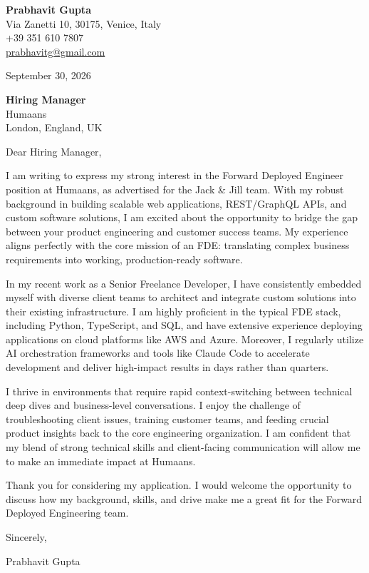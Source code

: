 \documentclass[11pt,a4paper]{article}
\begin{document}
\begin{flushleft}
\textbf{Prabhavit Gupta} \\
Via Zanetti 10, 30175, Venice, Italy \\
+39 351 610 7807 \\
\href{mailto:prabhavitg@gmail.com}{prabhavitg@gmail.com}
\end{flushleft}

\vspace{5mm}
\begin{flushright}
September 30, 2026
\end{flushright}

\vspace{5mm}
\begin{flushleft}
\textbf{Hiring Manager} \\
Humaans \\
London, England, UK
\end{flushleft}

\vspace{5mm}
\noindent Dear Hiring Manager,

\vspace{3mm}
\noindent I am writing to express my strong interest in the Forward Deployed Engineer position at Humaans, as advertised for the Jack \& Jill team. With my robust background in building scalable web applications, REST/GraphQL APIs, and custom software solutions, I am excited about the opportunity to bridge the gap between your product engineering and customer success teams. My experience aligns perfectly with the core mission of an FDE: translating complex business requirements into working, production-ready software.

\vspace{3mm}
\noindent In my recent work as a Senior Freelance Developer, I have consistently embedded myself with diverse client teams to architect and integrate custom solutions into their existing infrastructure. I am highly proficient in the typical FDE stack, including Python, TypeScript, and SQL, and have extensive experience deploying applications on cloud platforms like AWS and Azure. Moreover, I regularly utilize AI orchestration frameworks and tools like Claude Code to accelerate development and deliver high-impact results in days rather than quarters.

\vspace{3mm}
\noindent I thrive in environments that require rapid context-switching between technical deep dives and business-level conversations. I enjoy the challenge of troubleshooting client issues, training customer teams, and feeding crucial product insights back to the core engineering organization. I am confident that my blend of strong technical skills and client-facing communication will allow me to make an immediate impact at Humaans.

\vspace{3mm}
\noindent Thank you for considering my application. I would welcome the opportunity to discuss how my background, skills, and drive make me a great fit for the Forward Deployed Engineering team.

\vspace{5mm}
\noindent Sincerely,

\vspace{3mm}
\noindent Prabhavit Gupta
\end{document}
